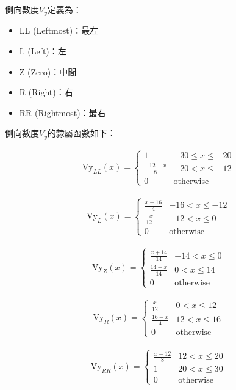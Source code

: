 \documentclass[12pt]{article}       %
\begin{document}
側向數度$V_{y}$定義為：
\begin{itemize}
    \item LL (Leftmost)：最左
    \item L (Left)：左
    \item Z (Zero)：中間
    \item R (Right)：右
    \item RR (Rightmost)：最右
\end{itemize}

側向數度$V_{y}$的隸屬函數如下：

\begin{align}
    \text{Vy}_{LL}(x) = 
    \begin{cases}
    1 & -30 \le x \le -20 \\
    \frac{-12 - x}{8} & -20 < x \le -12 \\
    0 & \text{otherwise}
    \end{cases}       
\end{align}

\begin{align}
    \text{Vy}_{L}(x) = 
    \begin{cases}
    \frac{x + 16}{4} & -16 < x \le -12 \\
    \frac{-x}{12} & -12 < x \le 0 \\
    0 & \text{otherwise}
    \end{cases}    
\end{align}

\begin{align}
    \text{Vy}_{Z}(x) = 
    \begin{cases}
    \frac{x + 14}{14} & -14 < x \le 0 \\
    \frac{14 - x}{14} & 0 < x \le 14 \\
    0 & \text{otherwise}
    \end{cases}     
\end{align}

\begin{align}
    \text{Vy}_{R}(x) = 
    \begin{cases}
    \frac{x}{12} & 0 < x \le 12 \\
    \frac{16 - x}{4} & 12 < x \le 16 \\
    0 & \text{otherwise}
    \end{cases}     
\end{align}

\begin{align}
    \text{Vy}_{RR}(x) = 
    \begin{cases}
    \frac{x - 12}{8} & 12 < x \le 20 \\
    1 & 20 < x \le 30 \\
    0 & \text{otherwise}
    \end{cases}       
\end{align}
\end{document}
